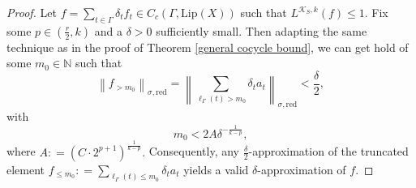 \documentclass[10pt,a4paper]{amsart}
\begin{document}
\begin{proof}
Let $f = \sum\limits_{t \in \Gamma} \delta_t f_t \in C_c(\Gamma, \mathrm {Lip} (X))$ such that $L^{\mathcal{K}_S, k}(f) \leq 1.$ Fix some $p \in \left (\frac {r} {2}, k \right )$ and a $\delta > 0$ sufficiently small. Then adapting the same technique as in the proof of Theorem \ref{general cocycle bound}, we can get hold of some $m_0 \in \mathbb N$ such that
$$\left \|f_{> m_0} \right \|_{\sigma, \mathrm {red}} = \left \|\sum\limits_{\ell_{\Gamma} (t) > m_0} \delta_t a_t \right \|_{\sigma, \mathrm {red}} < \frac {\delta} {2},$$ with
\begin{equation} \label{upper bound for m_0} m_0 < 2 A \delta^{- \frac {1} {k - p}}, \end{equation}
where $A : = \left (C \cdot 2^{p + 1} \right )^{\frac {1} {k - p}}.$ Consequently, any $\frac{\delta}{2}$-approximation of the truncated element $f_{\leq m_0} : = \sum\limits_{\ell_{\Gamma} (t) \leq m_0} \delta_t a_t$ yields a valid $\delta$-approximation of $f.$

\vspace{0.5mm}


\end{proof}
\end{document}
